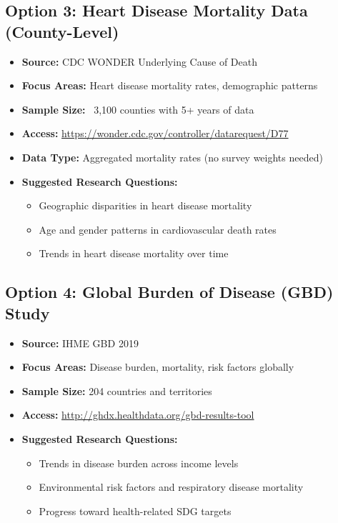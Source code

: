 \documentclass[11pt]{article}
\begin{document}
\subsection{Option 3: Heart Disease Mortality Data (County-Level)}
\begin{itemize}
\item \textbf{Source:} CDC WONDER Underlying Cause of Death
\item \textbf{Focus Areas:} Heart disease mortality rates, demographic patterns
\item \textbf{Sample Size:} ~3,100 counties with 5+ years of data
\item \textbf{Access:} \url{https://wonder.cdc.gov/controller/datarequest/D77}
\item \textbf{Data Type:} Aggregated mortality rates (no survey weights needed)
\item \textbf{Suggested Research Questions:}
    \begin{itemize}
    \item Geographic disparities in heart disease mortality
    \item Age and gender patterns in cardiovascular death rates
    \item Trends in heart disease mortality over time
    \end{itemize}
\end{itemize}

\subsection{Option 4: Global Burden of Disease (GBD) Study}
\begin{itemize}
\item \textbf{Source:} IHME GBD 2019
\item \textbf{Focus Areas:} Disease burden, mortality, risk factors globally
\item \textbf{Sample Size:} 204 countries and territories
\item \textbf{Access:} \url{http://ghdx.healthdata.org/gbd-results-tool}
\item \textbf{Suggested Research Questions:}
    \begin{itemize}
    \item Trends in disease burden across income levels
    \item Environmental risk factors and respiratory disease mortality
    \item Progress toward health-related SDG targets
    \end{itemize}
\end{itemize}
\end{document}
